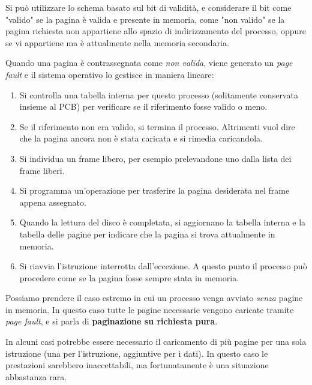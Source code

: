         Si può utilizzare lo schema basato sul bit di validità, e considerare il bit come "valido" se la pagina è valida e presente in memoria, come "non valido" se la pagina richiesta non appartiene allo spazio di indirizzamento del processo, oppure se vi appartiene ma è attualmente nella memoria secondaria.
        
        Quando una pagina è contrassegnata come \textit{non valida}, viene generato un \textit{page fault} e il sistema operativo lo gestisce in maniera lineare:
        \begin{enumerate}
            \item Si controlla una tabella interna per questo processo (solitamente conservata insieme al PCB) per verificare se il riferimento fosse valido o meno.
            
            \item Se il riferimento non era valido, si termina il processo. Altrimenti vuol dire che la pagina ancora non è stata caricata e si rimedia caricandola.
            
            \item Si individua un frame libero, per esempio prelevandone uno dalla lista dei frame liberi.
            
            \item Si programma un'operazione per trasferire la pagina desiderata nel frame appena assegnato.
            
            \item Quando la lettura del disco è completata, si aggiornano la tabella interna e la tabella delle pagine per indicare che la pagina si trova attualmente in memoria.
            
            \item Si riavvia l'istruzione interrotta dall'eccezione. A questo punto il processo può procedere come se la pagina fosse sempre stata in memoria.
        \end{enumerate}
        
        Possiamo prendere il caso estremo in cui un processo venga avviato \textit{senza} pagine in memoria. In questo caso tutte le pagine necessarie vengono caricate tramite \textit{page fault}, e si parla di \textbf{paginazione su richiesta pura}.
        
        In alcuni casi potrebbe essere necessario il caricamento di più pagine per una sola istruzione (una per l'istruzione, aggiuntive per i dati). In questo caso le prestazioni sarebbero inaccettabili, ma fortunatamente è una situazione abbastanza rara.
        
